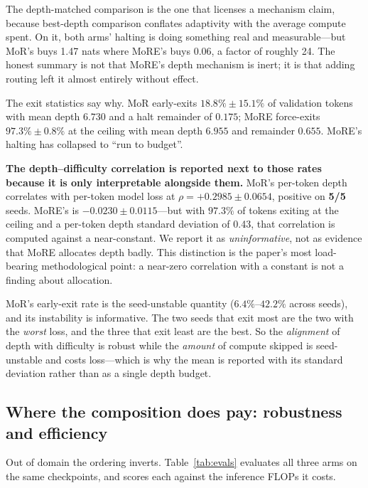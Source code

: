 The depth-matched comparison is the one that licenses a mechanism claim, because
best-depth comparison conflates adaptivity with the average compute spent. On it,
both arms' halting is doing something real and measurable---but MoR's buys 1.47
nats where MoRE's buys 0.06, a factor of roughly 24. The honest summary is not that
MoRE's depth mechanism is inert; it is that adding routing left it almost entirely
without effect.

The exit statistics say why. MoR early-exits $18.8\% \pm 15.1\%$ of validation
tokens with mean depth $6.730$ and a halt remainder of $0.175$;
MoRE force-exits $97.3\% \pm 0.8\%$ at the ceiling with mean depth $6.955$ and
remainder $0.655$. MoRE's halting has collapsed to ``run to budget''.

\textbf{The depth--difficulty correlation is reported next to those rates because
it is only interpretable alongside them.} MoR's per-token depth correlates with
per-token model loss at $\rho = +0.2985 \pm 0.0654$, positive on \textbf{5/5}
seeds. MoRE's is $-0.0230 \pm 0.0115$---but with $97.3\%$ of tokens exiting at the
ceiling and a per-token depth standard deviation of 0.43, that correlation is
computed against a near-constant. We report it as \emph{uninformative}, not as
evidence that MoRE allocates depth badly. This distinction is the paper's most
load-bearing methodological point: a near-zero correlation with a constant is not
a finding about allocation.

MoR's early-exit rate is the seed-unstable quantity ($6.4\%$--$42.2\%$ across
seeds), and its instability is informative. The two seeds that exit most are the
two with the \emph{worst} loss, and the three that exit least are the best. So the
\emph{alignment} of depth with difficulty is robust while the \emph{amount} of
compute skipped is seed-unstable and costs loss---which is why the mean is reported
with its standard deviation rather than as a single depth budget.

\subsection{Where the composition does pay: robustness and efficiency}
\label{sec:ood}

Out of domain the ordering inverts. Table~\ref{tab:evals} evaluates all three arms
on the same checkpoints, and scores each against the inference FLOPs it costs.

